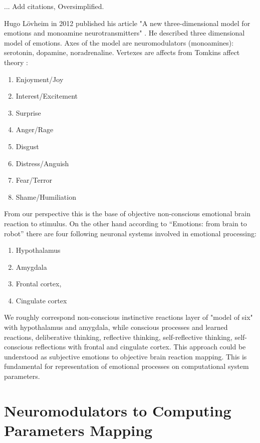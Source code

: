 ... Add citations, Oversimplified.

Hugo L\"{o}vheim in 2012 published his article "A new three-dimensional model for emotions and monoamine neurotransmitters" \cite{cubeofemotions}. He described three dimensional model of emotions. Axes of the model are neuromodulators (monoamines): serotonin, dopamine, noradrenaline. Vertexes are affects from Tomkins affect theory \cite{primer_affect_psychology}:

\begin{enumerate}
 \item  Enjoyment/Joy
 \item  Interest/Excitement
 \item  Surprise
 \item  Anger/Rage
 \item  Disgust
 \item  Distress/Anguish
 \item  Fear/Terror
 \item  Shame/Humiliation
\end{enumerate}

From our perspective this is the base of objective non-conscious emotional brain reaction to stimulus. On the other hand according to ``Emotions: from brain to robot'' \cite{emotionsbraintorobot} there are four following neuronal systems involved in emotional processing:

\begin{enumerate}
 \item Hypothalamus
 \item Amygdala
 \item Frontal cortex, 
 \item Cingulate cortex
\end{enumerate}

We roughly correspond non-conscious instinctive reactions layer of "model of six" \cite{emotionmachine} with hypothalamus and amygdala, while conscious processes and learned reactions, deliberative thinking, reflective thinking, self-reflective thinking, self-conscious reflections with frontal and cingulate cortex. This approach could be understood as subjective emotions to objective brain reaction mapping. This is fundamental for representation of emotional processes on computational system parameters.

\section{Neuromodulators to Computing Parameters Mapping}

